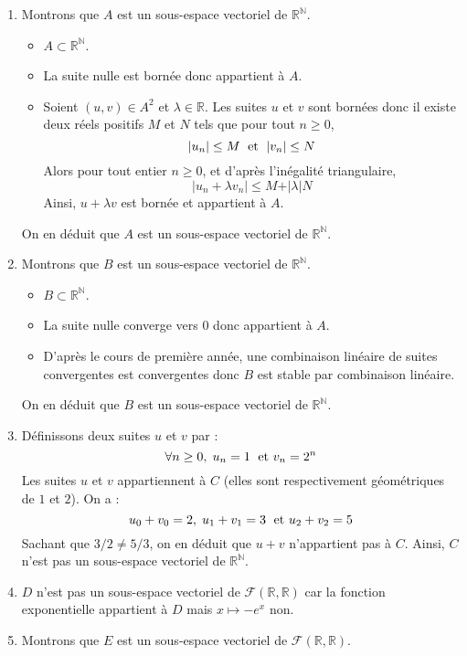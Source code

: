\documentclass[a4paper,twoside,french,11pt]{VcCours}
\begin{document}
\corr 

\begin{enumerate}
\item Montrons que $A$ est un sous-espace vectoriel de $\mathbb{R}^{\mathbb{N}}$.
\begin{itemize}
\item $A \subset \mathbb{R}^{\mathbb{N}}$.
\item La suite nulle est bornée donc appartient à $A$.
\item Soient $(u,v) \in A^2$ et $\lambda \in \mathbb{R}$. Les suites $u$ et $v$ sont bornées donc il existe deux réels positifs $M$ et $N$ tels que pour tout $n \geq 0$,
$$ \vert u_n \vert \leq M \; \hbox{ et } \; \vert v_n \vert \leq N$$
Alors pour tout entier $n \geq 0$, et d'après l'inégalité triangulaire,
$$ \vert u_n + \lambda v_n \vert \leq M+ \vert \lambda \vert N$$
Ainsi, $u+ \lambda v$ est bornée et appartient à $A$.
\end{itemize}
On en déduit que $A$ est un sous-espace vectoriel de $\mathbb{R}^{\mathbb{N}}$.
\item Montrons que $B$ est un sous-espace vectoriel de $\mathbb{R}^{\mathbb{N}}$.
\begin{itemize}
\item $B \subset \mathbb{R}^{\mathbb{N}}$.
\item La suite nulle converge vers $0$ donc appartient à $A$.
\item D'après le cours de première année, une combinaison linéaire de suites convergentes est convergentes donc $B$ est stable par combinaison linéaire.
\end{itemize}
On en déduit que $B$ est un sous-espace vectoriel de $\mathbb{R}^{\mathbb{N}}$.
\item Définissons deux suites $u$ et $v$ par :
$$ \forall n \geq 0, \; u_n = 1 \; \hbox{ et } v_n = 2^n$$
Les suites $u$ et $v$ appartiennent à $C$ (elles sont respectivement géométriques de $1$ et $2$). On a :
$$ u_0+v_0 = 2, \; u_1+v_1 = 3 \; \hbox{ et } u_2+v_2 = 5$$
Sachant que $3/2 \neq 5/3$, on en déduit que $u+v$ n'appartient pas à $C$. Ainsi, $C$ n'est pas un sous-espace vectoriel de $\mathbb{R}^{\mathbb{N}}$.
\item $D$ n'est pas un sous-espace vectoriel de $\mathcal{F}(\mathbb{R}, \mathbb{R})$ car la fonction exponentielle appartient à $D$ mais $x \mapsto -e^x$ non.
\item Montrons que $E$ est un sous-espace vectoriel de $\mathcal{F}(\mathbb{R}, \mathbb{R})$.
\begin{itemize}

\end{itemize}
\end{enumerate}
\end{document}
